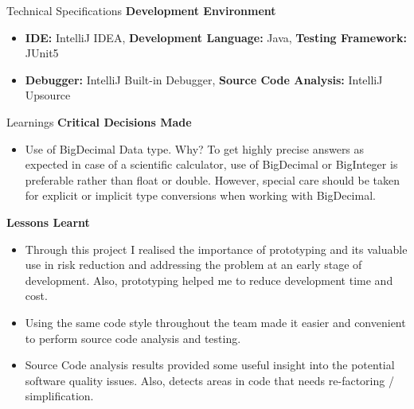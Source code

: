 \documentclass[final,hyperref={pdfpagelabels=false}]{beamer}
\begin{document}
\begin{frame}{}
\begin{block}{\Large Technical Specifications}
			\vspace{1cm}			
			\textbf{\large Development Environment} \\ \vspace{0.5cm}
			\begin{itemize}
				\item \textbf{IDE: }IntelliJ IDEA, \textbf{Development Language: }Java, \textbf{Testing Framework: }JUnit5
				\item \textbf{Debugger: }IntelliJ Built-in Debugger, \textbf{Source Code Analysis: }IntelliJ Upsource
			\end{itemize}
			
		\end{block}
	
		\begin{block}{\Large Learnings}
			\textbf{\large Critical Decisions Made} \\ \vspace{0.5cm}
			\begin{itemize}
					\item Use of BigDecimal Data type. Why? To get highly precise answers as expected in case of a scientific calculator, use of BigDecimal or BigInteger is preferable rather than float or double. However, special care should be taken for explicit or implicit type conversions when working with BigDecimal.
			\end{itemize}
		
		\vspace{0.5cm}
		\textbf{\large Lessons Learnt} \\ \vspace{0.5cm}
		\begin{itemize}
			\item Through this project I realised the importance of prototyping and its valuable use in risk reduction and addressing the problem at an early stage of development. Also, prototyping helped me to reduce development time and cost.
			\item Using the same code style throughout the team made it easier and convenient to perform source code analysis and testing.
			\item Source Code analysis results provided some useful insight into the potential software quality issues. Also, detects areas in code that needs re-factoring / simplification.
		\end{itemize}
		\end{block}
					
	\end{frame}
\end{document}
